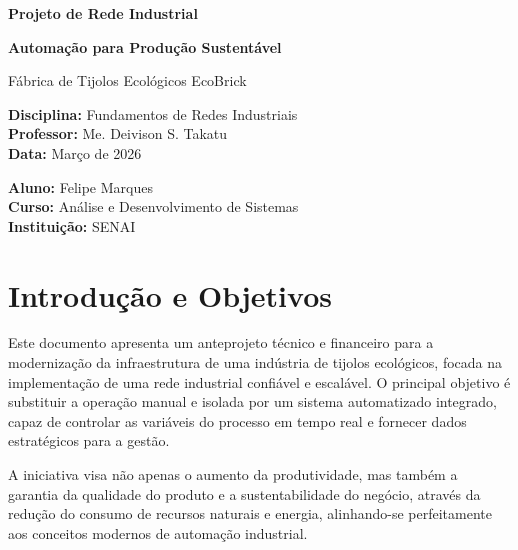 \documentclass[12pt,a4paper]{article}
\begin{document}
\begin{titlepage}
    \centering
    \vspace*{2cm}

    {\Huge\bfseries Projeto de Rede Industrial\par}
    \vspace{0.5cm}
    {\LARGE\bfseries Automação para Produção Sustentável\par}
    \vspace{1cm}
    {\Large Fábrica de Tijolos Ecológicos EcoBrick\par}

    \vspace{2cm}

    \begin{flushleft}
        \textbf{Disciplina:} Fundamentos de Redes Industriais\\
        \textbf{Professor:} Me. Deivison S. Takatu\\
        \textbf{Data:} Março de 2026
    \end{flushleft}

    \vspace{2cm}

    \begin{flushright}
        \textbf{Aluno:} Felipe Marques\\
        \textbf{Curso:} Análise e Desenvolvimento de Sistemas\\
        \textbf{Instituição:} SENAI
    \end{flushright}

    \vfill

\end{titlepage}

\tableofcontents
\newpage

\section{Introdução e Objetivos}

Este documento apresenta um anteprojeto técnico e financeiro para a modernização da infraestrutura de uma indústria de tijolos ecológicos, focada na implementação de uma rede industrial confiável e escalável. O principal objetivo é substituir a operação manual e isolada por um sistema automatizado integrado, capaz de controlar as variáveis do processo em tempo real e fornecer dados estratégicos para a gestão.

A iniciativa visa não apenas o aumento da produtividade, mas também a garantia da qualidade do produto e a sustentabilidade do negócio, através da redução do consumo de recursos naturais e energia, alinhando-se perfeitamente aos conceitos modernos de automação industrial.
\end{document}
